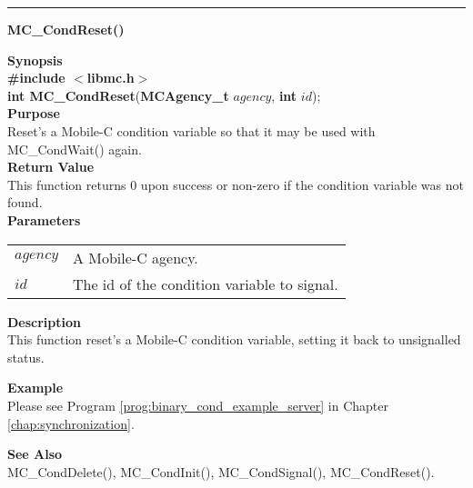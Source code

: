 \noindent
\vspace{5pt}
\rule{6.5in}{0.015in}
\noindent
{}
{\LARGE \bf MC\_CondReset()}\\

\noindent
{\bf Synopsis}\\
{\bf \#include $<$libmc.h$>$}\\
{\bf int MC\_CondReset}({\bf MCAgency\_t} $agency$, {\bf int} $id$);\\

\noindent
{\bf Purpose}\\
Reset's a Mobile-C condition variable so that it may be used with MC\_CondWait() again. \\

\noindent
{\bf Return Value}\\
This function returns 0 upon success or non-zero if the condition 
variable was not found. \\

\noindent
{\bf Parameters}
\vspace{-0.1pt}
\begin{description}
\item
\begin{tabular}{p{10 mm}p{145 mm}} 
$agency$ & A Mobile-C agency. \\
$id$ & The id of the condition variable to signal. 
\end{tabular}
\end{description}

\noindent
{\bf Description}\\
This function reset's a Mobile-C condition variable, setting it back to 
unsignalled status. 

\noindent
{\bf Example}\\
Please see Program \vref{prog:binary_cond_example_server} in 
Chapter \ref{chap:synchronization}.\\

\noindent

\noindent
{\bf See Also}\\
MC\_CondDelete(), MC\_CondInit(), MC\_CondSignal(), 
  \linebreak MC\_CondReset().\\

